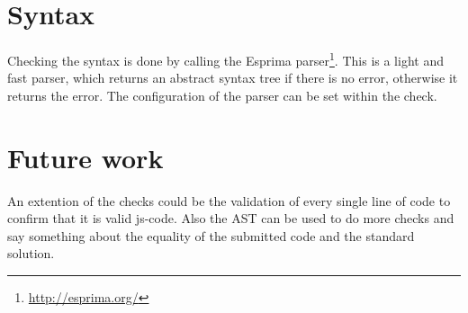 \section{Syntax}

Checking the syntax is done by calling the Esprima parser\footnote{\url{http://esprima.org/}}.
This is a light and fast parser, which returns an abstract syntax tree if there
is no error, otherwise it returns the error.
The configuration of the parser can be set within the check.

\section{Future work}
An extention of the \glspl{check} could be the validation of
every single line of code to confirm that it is valid \gls{js-code}.
Also the AST can be used to do more \glspl{check} and say something about the
equality of the submitted code and the standard solution.
